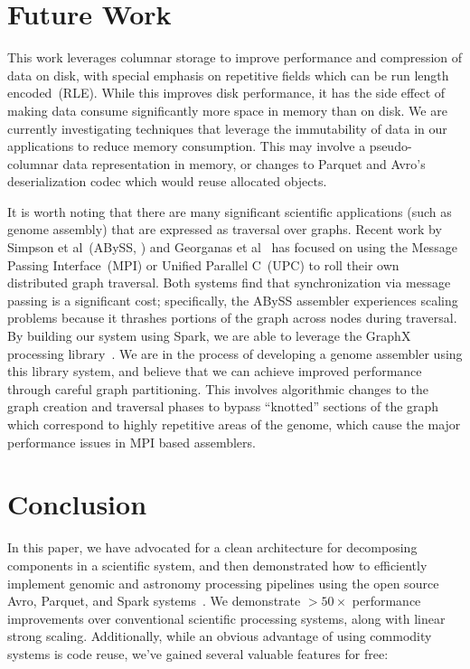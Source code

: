 \documentclass{acm_proc_article-sp}
\begin{document}
\section{Future Work}
\label{sec:future-work}

This work leverages columnar storage to improve performance and compression of data on disk,
with special emphasis on repetitive fields which can be run length encoded~(RLE). While this improves
disk performance, it has the side effect of making data consume significantly more space in memory
than on disk. We are currently investigating techniques that leverage the immutability of data in our
applications to reduce memory consumption. This may involve a pseudo-columnar data representation
in memory, or changes to Parquet and Avro's deserialization codec which would reuse allocated objects.

It is worth noting that there are many significant scientific applications (such as genome
assembly) that are expressed as traversal over graphs. Recent work by Simpson et al~(ABySS,
\cite{simpson09}) and Georganas et al~\cite{georganas14} has focused on using the Message Passing
Interface~(MPI) or Unified Parallel C~(UPC) to roll their own distributed graph traversal. Both systems
find that synchronization via message passing is a significant cost; specifically, the ABySS assembler
experiences scaling problems because it thrashes portions of the graph across nodes during traversal.
By building our system using Spark, we are able to leverage the GraphX processing library~\cite{xin13}.
We are in the process of developing a genome assembler using this library system, and believe that we
can achieve improved performance through careful graph partitioning. This involves algorithmic changes
to the graph creation and traversal phases to bypass ``knotted'' sections of the graph which
correspond to highly repetitive areas of the genome, which cause the major performance issues in MPI
based assemblers.

\section{Conclusion}
\label{sec:conclusion}

In this paper, we have advocated for a clean architecture for decomposing components in a scientific
system, and then demonstrated how to efficiently implement genomic and astronomy processing
pipelines using the open source Avro, Parquet, and Spark systems~\cite{avro, parquet, zaharia10}.
We demonstrate $>50\times$ performance improvements over conventional scientific processing
systems, along with linear strong scaling. Additionally, while an obvious advantage of using commodity
systems is code reuse, we've gained several valuable features for free:
\end{document}
